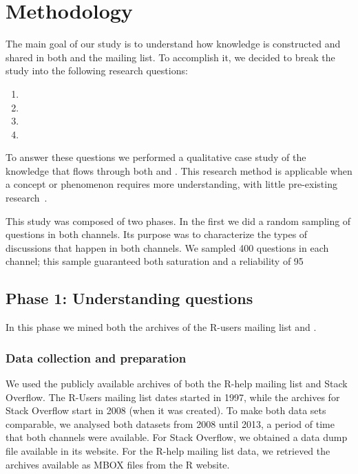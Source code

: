 \section{Methodology}
\label{cha:methodology}

The main goal of our study is to understand how knowledge is constructed and shared in both \SO and the \RH mailing list. To accomplish it, we decided to break
the study into the 
following research questions:
 

    \begin{enumerate}[label=\bfseries{RQ-\arabic*.},itemsep=3pt, topsep=2pt, leftmargin=3em, parsep=0pt]
        \item \rqa
        \item \rqb
        \item \rqc
        \item \rqd
    \end{enumerate}

To answer these questions we performed a qualitative case study of the knowledge that flows through both \RH and \SO. 
This research method is applicable when a concept or phenomenon requires more understanding, with little pre-existing research~\cite{Creswell2009}.

This study was composed
of two phases. In the first we did a random sampling of questions in both channels. Its purpose was to characterize the types of discussions that happen in both
channels. We sampled 400 questions in each channel; this sample guaranteed both saturation and a reliability of 95%



\subsection{Phase 1: Understanding questions} 
\label{sec:studyDesign}

In this phase we mined both the archives of the R-users mailing list and \SO.

\subsubsection{Data collection and preparation}
\label{subsec:preparation}

We used the publicly available archives of both	the R-help mailing list and Stack Overflow. The R-Users mailing list dates started in 1997, while
the archives for Stack Overflow start in 2008 (when it was created).
To make both data sets comparable, we analysed both datasets from 2008 until 2013, a period of time that both channels were available.
For Stack Overflow, we obtained a data dump file available in its website. For the R-help mailing list data, we retrieved the archives available as MBOX files from the R website.

